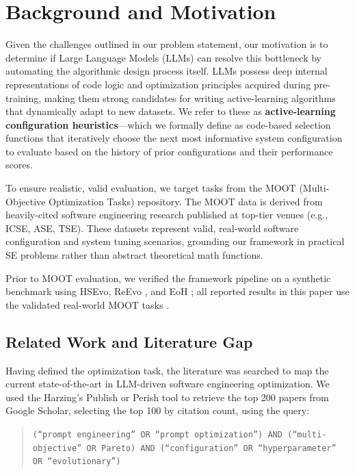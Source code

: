 \documentclass[sigconf,nonacm]{acmart}
\begin{document}
\section{Background and Motivation}

Given the challenges outlined in our problem statement, our motivation is to determine if Large Language Models (LLMs) can resolve this bottleneck by automating the algorithmic design process itself. LLMs possess deep internal representations of code logic and optimization principles acquired during pre-training, making them strong candidates for writing active-learning algorithms that dynamically adapt to new datasets. We refer to these as \textbf{active-learning configuration heuristics}---which we formally define as code-based selection functions that iteratively choose the next most informative system configuration to evaluate based on the history of prior configurations and their performance scores. 

To ensure realistic, valid evaluation, we target tasks from the MOOT (Multi-Objective Optimization Tasks) repository. The MOOT data is derived from heavily-cited software engineering research published at top-tier venues (e.g., ICSE, ASE, TSE). These datasets represent valid, real-world software configuration and system tuning scenarios, grounding our framework in practical SE problems rather than abstract theoretical math functions.

Prior to MOOT evaluation, we verified the framework pipeline on a synthetic benchmark using HSEvo, ReEvo \cite{reevo2024}, and EoH \cite{eoh2024}; all reported results in this paper use the validated real-world MOOT tasks \cite{menzies2024moot}.

\subsection{Related Work and Literature Gap}

Having defined the optimization task, the literature was searched to map the current state-of-the-art in LLM-driven software engineering optimization. We used the Harzing's Publish or Perish tool to retrieve the top 200 papers from Google Scholar, selecting the top 100 by citation count, using the query:

\begin{quote}
\texttt{(``prompt engineering'' OR ``prompt optimization'') AND (``multi-objective'' OR Pareto) AND (``configuration'' OR ``hyperparameter'' OR ``evolutionary'')}
\end{quote}
\end{document}
